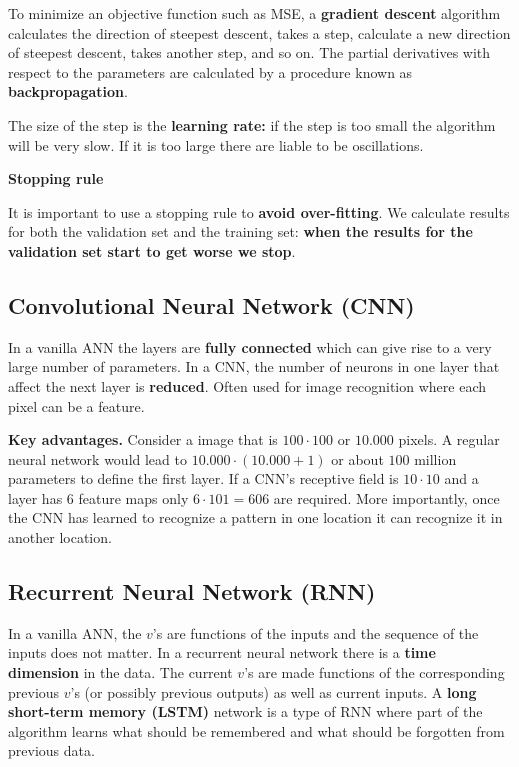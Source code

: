 To minimize an objective function such as MSE, a \textbf{gradient descent} algorithm calculates the direction of steepest descent, takes a step, calculate a new direction of steepest descent, takes another step, and so on. The partial derivatives with respect to the parameters are calculated by a procedure known as \textbf{backpropagation}.

The size of the step is the \textbf{learning rate:} if the step is too small the algorithm will be very slow. If it is too large there are liable to be oscillations.

\textbf{Stopping rule}

It is important to use a stopping rule to \textbf{avoid over-fitting}. We calculate results for both the validation set and the training set: \textbf{when the results for the validation set start to get worse we stop}.

\subsection{Convolutional Neural Network (CNN)}

In a vanilla ANN the layers are \textbf{fully connected} which can give rise to a very large number of parameters. In a CNN, the number of neurons in one layer that affect the next layer is \textbf{reduced}. Often used for image recognition where each pixel can be a feature.

\textbf{Key advantages.} Consider a image that is $100 \cdot 100$ or $10.000$ pixels. A regular neural network would lead to $10.000\cdot(10.000+1)$ or about $100$ million parameters to define the first layer. If a CNN's receptive field is $10\cdot 10$ and a layer has $6$ feature maps only $6\cdot 101 = 606$ are required. More importantly, once the CNN has learned to recognize a pattern in one location it can recognize it in another location.


\subsection{Recurrent Neural Network (RNN)}

In a vanilla ANN, the $v$’s are functions of the inputs and the sequence of the inputs does not matter. In a recurrent neural network there is a \textbf{time dimension} in the data. The current $v$’s are made functions of the corresponding previous $v$’s (or possibly previous outputs) as well as current inputs. A \textbf{long short-term memory (LSTM)} network is a type of RNN where part of the algorithm learns what should be remembered and what should be forgotten from previous data.

